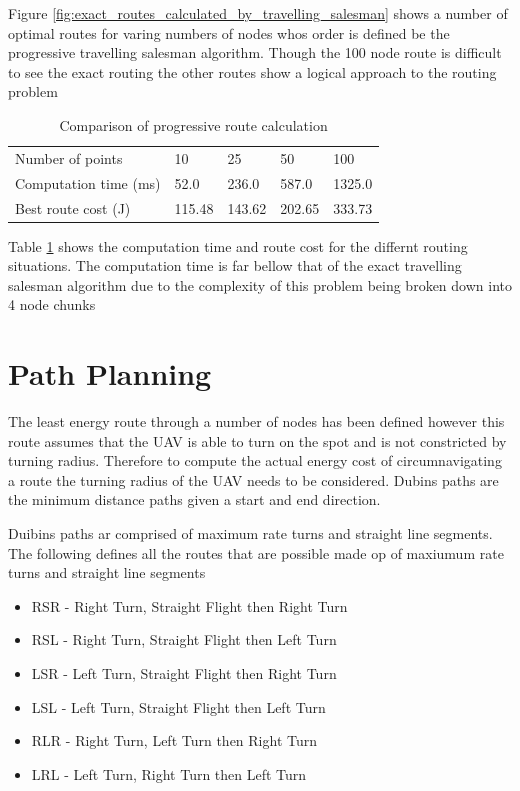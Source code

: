 \documentclass[a4paper,12pt,twoside]{article}
\begin{document}
Figure \ref{fig:exact_routes_calculated_by_travelling_salesman} shows a number of optimal routes for varing numbers of nodes whos order is defined be the progressive travelling salesman algorithm. Though the 100 node route is difficult to see the exact routing the other routes show a logical approach to the routing problem

\begin{table}[width=\textwidth]
\centering
    \begin{tabular}{lllll}
    Number of points	& 10	& 25	& 50	& 100	\\
Computation time (ms)	& 52.0	& 236.0	& 587.0	& 1325.0	\\
Best route cost (J)	& 115.48	& 143.62	& 202.65	& 333.73	\\

    \end{tabular}
\caption{Comparison of progressive route calculation}
\label{tbl:comparison_of_progressive_route_calculation}
\end{table}

Table \ref{tbl:comparison_of_progressive_route_calculation} shows the computation time and route cost for the differnt routing situations. The computation time is far bellow that of the exact travelling salesman algorithm due to the complexity of this problem being broken down into 4 node chunks

\section{Path Planning}
\label{sec:path_planning}

The least energy route through a number of nodes has been defined however this route assumes that the UAV is able to turn on the spot and is not constricted by turning radius. Therefore to compute the actual energy cost of circumnavigating a route the turning radius of the UAV needs to be considered. Dubins paths are the minimum distance paths given a start and end direction.

Duibins paths ar comprised of maximum rate turns and straight line segments. The following defines all the routes that are possible made op of maxiumum rate turns and straight line segments

\begin{itemize}
\setlength{\itemsep}{-20pt}
\item RSR - Right Turn, Straight Flight then Right Turn
\item RSL - Right Turn, Straight Flight then Left Turn
\item LSR - Left Turn, Straight Flight then Right Turn
\item LSL - Left Turn, Straight Flight then Left Turn
\item RLR - Right Turn, Left Turn then Right Turn
\item LRL - Left Turn, Right Turn then Left Turn
\end{itemize}
\end{document}
